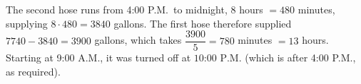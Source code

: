 The second hose runs from 4:00 P.M.\ to midnight, $8$ hours $=480$ minutes, supplying $8\cdot480=3840$ gallons. The first hose therefore supplied $7740-3840=3900$ gallons, which takes $\dfrac{3900}{5}=780$ minutes $=13$ hours. Starting at 9:00 A.M., it was turned off at $\boxed{\text{10:00 P.M.}}$ (which is after 4:00 P.M., as required).
